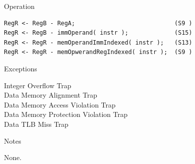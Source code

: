 \begin{iPageDescOpEntry}{Operation}
\begin{lstlisting}[style=iPageOpStyle]
RegR <- RegB - RegA;                            (S9 )
RegR <- RegB - immOperand( instr );             (S15)
RegR <- RegR - memOperandImmIndexed( instr );   (S13)
RegR <- RegR - memOpwerandRegIndexed( instr );  (S9 )
\end{lstlisting}
\end{iPageDescOpEntry}

\begin{iPageDescEntry}{Exceptions}{

 	Integer Overflow Trap\\
	Data Memory Alignment Trap\\
	Data Memory Access Violation Trap\\
	Data Memory Protection Violation Trap\\
	Data TLB Miss Trap
}
\end{iPageDescEntry}

\begin{iPageDescEntry}{Notes}{

	None. 
}
\end{iPageDescEntry}
